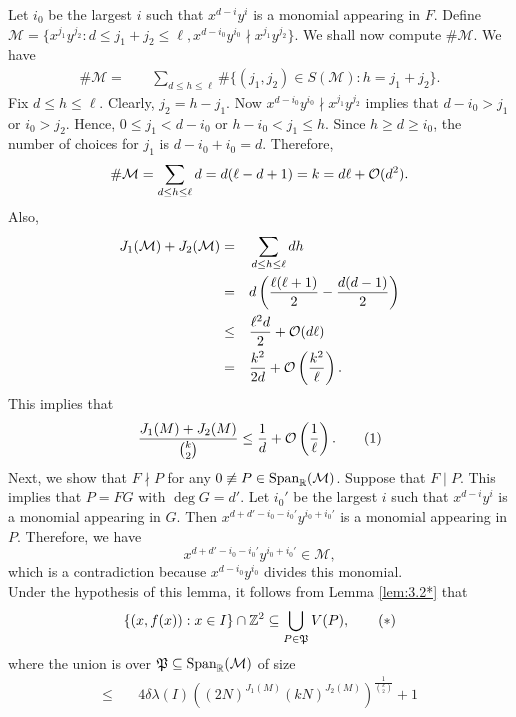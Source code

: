 \documentclass{Vorlesungstemplate_English} %
\begin{document}
\begin{pf}
  Let $i_0$ be the largest $i$ such that $x^{d-i}y^i$ is a monomial appearing in $F$. Define $\mathcal M = \{ x^{j_1}y^{j_2}: d \leq j_1+j_2 \leq \ell, x^{d-i_0}y^{i_0} \nmid x^{j_1}y^{j_2}\}$. We shall now compute $\#\mathcal M$. We have
  \begin{align*}
    \#\mathcal M = \quad & \sum_{d \leq h \leq \ell} \#\{ (j_1,j_2) \in S(\mathcal M): h = j_1+j_2\}.
  \end{align*}
  Fix $d \leq h \leq \ell$. Clearly, $j_2 = h-j_1$. Now $x^{d-i_0}y^{i_0} \nmid x^{j_1}y^{j_2}$ implies that $d-i_0 > j_1$ or $i_0 > j_2$. Hence, $0 \leq j_1 < d-i_0$ or $h-i_0<j_1 \leq h$. Since $h \geq d \geq i_0$, the number of choices for $j_1$ is $d-i_0+i_0 = d$. Therefore, \[\#\mathcal{M} =  \sum_{d \leq h \leq \ell} d = d(\ell-d+1) = k = d\ell + \mathcal{O}(d^2).\]
  Also, \begin{align*} J_1(\mathcal M) + J_2(\mathcal M) = \quad & \sum_{d \leq h \leq \ell} dh \\
  = \quad & d\left(\frac{\ell(\ell+1)}{2}-\frac{d(d-1)}{2}\right) \\
  \leq \quad & \frac{\ell^2d}{2} + \mathcal{O}(d\ell) \\
  = \quad & \frac{k^2}{2d} + \mathcal{O}\left(\frac{k^2}{\ell}\right).\end{align*}
  This implies that
  \begin{equation}\label{eq:lem3.9:1}
    \frac{J_1(M)+J_2(M)}{\binom{k}{2}} \leq \frac{1}{d} + \mathcal{O}\left(\frac{1}{\ell}\right). \tag{1}
  \end{equation}
  Next, we show that $F \nmid P$ for any $0 \not\equiv P \in \text{Span}_{\mathbb{R}}(\mathcal M)$. Suppose that $F \mid P$. This implies that $P = FG$ with $\deg G = d'$. Let $i_0'$ be the largest $i$ such that $x^{d-i}y^i$ is a monomial appearing in $G$. Then $x^{d+d'-i_0-i_0'}y^{i_0+i_0'}$ is a monomial appearing in $P$. Therefore, we have
  \[ x^{d+d'-i_0-i_0'}y^{i_0+i_0'} \in \mathcal M,\]
  which is a contradiction because $x^{d-i_0}y^{i_0}$ divides this monomial. \Lightning \\
  Under the hypothesis of this lemma, it follows from Lemma \ref{lem:3.2*} that
  \begin{equation}\label{eq:lem3.9:2} \{ (x,f(x)): x \in I\} \cap \mathbb{Z}^2 \subseteq \bigcup_{P \in \mathfrak{P}} V(P),\tag{$*$}\end{equation}
  where the union is over $\mathfrak{P} \subseteq \text{Span}_{\mathbb{R}}(\mathcal M)$ of size \begin{align*}\leq \quad &  4\delta\lambda(I)((2N)^{J_1(M)}(kN)^{J_2(M)})^{\frac{1}{\binom{k}{2}}} + 1 \\

\end{align*}
\end{pf}
\end{document}
